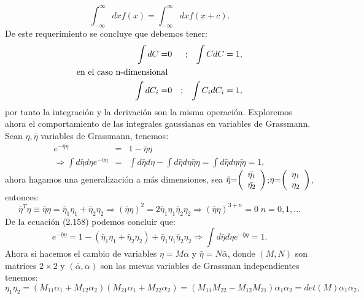 \begin{equation}
\int_{-\infty}^{\infty}dxf(x)=\int_{-\infty}^{\infty}dxf(x+c) .
\end{equation}
De este requerimiento se concluye que debemos tener:
\begin{eqnarray}
\int dC=&0&; \hspace{0.3 cm} \int CdC=1,\\
\nonumber \text{en el caso n-dimensional}&&\\
\int dC_i=&0&; \hspace{0.3 cm} \int C_idC_i=1 ,
\end{eqnarray}
por tanto la integración y la derivación son la misma operación. Exploremos ahora el comportamiento de las integrales gaussianas en variables de Grassmann. Sean $\eta,\bar{\eta}$ variables de Grassmann, tenemos:
\begin{eqnarray}
e^{-\bar{\eta}\eta}&=&1-\bar{\eta}\eta\\
\Rightarrow\int d\bar{\eta}d\eta e^{-\bar{\eta}\eta}&=&\int d\bar{\eta}d\eta-\int d\bar{\eta}d\eta\bar{\eta}\eta=\int d\bar{\eta}d\eta\bar{\eta\eta}=1,
\end{eqnarray}
ahora hagamos una generalización a más dimensiones, sea $\text{\ensuremath{\bar{\eta}}=\ensuremath{\left(\begin{array}{c}
\bar{\eta_{1}}\\
\bar{\eta_{2}}
\end{array}\right)}}$;$\text{\ensuremath{\eta}=\ensuremath{\left(\begin{array}{c}
\eta_{1}\\
\eta_{2}
\end{array}\right)}}$, entonces:
\begin{equation}
\bar{\eta}^T\eta\equiv \bar{\eta}\eta=\bar{\eta}_1\eta_1+\bar{\eta}_2\eta_2\Rightarrow (\bar{\eta}\eta)^2=2\bar{\eta}_1\eta_1\bar{\eta}_2\eta_2\Rightarrow (\bar{\eta}\eta)^{3+n}=0 \;n=0,1,... 
\end{equation}
De la ecuación (2.158) podemos concluir que:
\begin{equation}
e^{-\bar{\eta}\eta}=1-(\bar{\eta}_1\eta_1+\bar{\eta}_2\eta_2)+\bar{\eta}_1\eta_1\bar{\eta}_2\eta_2\Rightarrow \int d\bar{\eta}d\eta e^{-\bar{\eta}\eta}=1.
\end{equation}
Ahora si hacemos el cambio de variables $\eta=M\alpha$ y $\bar{\eta}=N\bar{\alpha}$, donde $(M,N)$ son matrices $2\times 2$ y $(\bar{\alpha},\alpha)$ son las nuevas variables de Grassman independientes tenemos:
\begin{equation}
\eta_{1}\eta_{2}=(M_{11}\alpha_{1}+M_{12}\alpha_{2})(M_{21}\alpha_{1}+M_{22}\alpha_{2})=(M_{11}M_{22}-M_{12}M_{21})\alpha_{1}\alpha_{2}=det(M)\alpha_{1}\alpha_{2},
\end{equation}
